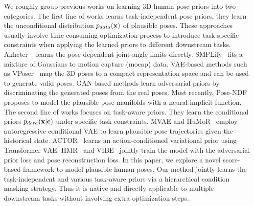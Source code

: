 \documentclass[10pt,twocolumn,letterpaper]{article}
\begin{document}
We roughly group previous works on learning 3D human pose priors into two categories. The first line of works learns task-independent pose priors, \ie they learn the unconditional distribution $p_{data}(\mathbf{x})$ of plausible poses. These approaches usually involve time-consuming optimization process to introduce task-specific constraints when applying the learned priors to different downstream tasks. Akheter \etal~\cite{akhter2015pose} learns the pose-dependent joint-angle limits directly. SMPLify~\cite{bogo2016keep} fits a mixture of Gaussians to motion capture (mocap) data. VAE-based methods such as VPoser~\cite{pavlakos2019expressive} map the 3D poses to a compact representation space and can be used to generate valid poses. GAN-based methods\cite{davydov2022adversarial} learn adversarial priors by discriminating the generated poses from the real poses. Most recently, Pose-NDF~\cite{tiwari2022pose} proposes to model the plausible pose manifolds with a neural implicit function. 
The second line of works focuses on task-aware priors. They learn the conditional priors $p_{data}(\mathbf{x} | \mathbf{c})$ under specific task constraints. MVAE\cite{ling2020character} and HuMoR~\cite{rempe2021humor} employ autoregressive conditional VAE to learn plausible pose trajectories given the historical state. ACTOR~\cite{petrovich21actor} learns an action-conditioned variational prior using Transformer VAE.
HMR~\cite{hmrKanazawa17} and VIBE~\cite{kocabas2019vibe} jointly train the model with the adversarial prior loss and pose reconstruction loss.
In this paper, we explore a novel score-based framework to model plausible human poses. Our method jointly learns the task-independent and various task-aware priors via a hierarchical condition masking strategy. Thus it is native and directly applicable to multiple downstream tasks without involving extra optimization steps.
\end{document}
